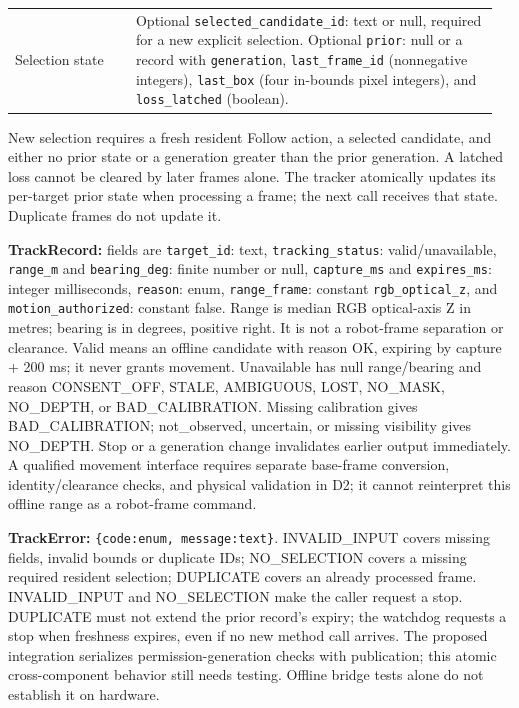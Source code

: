 \documentclass[12pt,letterpaper]{article}
\newcommand{\field}[1]{\texttt{#1}}
\begin{document}
\begin{longtable}{@{}>{\RaggedRight\arraybackslash}p{0.24\linewidth}>{\RaggedRight\arraybackslash}p{0.72\linewidth}@{}}
Selection state & Optional \field{selected\_candidate\_id}: text or null, required for a new explicit selection. Optional \field{prior}: null or a record with \field{generation}, \field{last\_frame\_id} (nonnegative integers), \field{last\_box} (four in-bounds pixel integers), and \field{loss\_latched} (boolean). \\
\end{longtable}
\endgroup

New selection requires a fresh resident Follow action, a selected candidate, and either no prior state or a generation greater than the prior generation. A latched loss cannot be cleared by later frames alone. The tracker atomically updates its per-target prior state when processing a frame; the next call receives that state. Duplicate frames do not update it.

\textbf{TrackRecord:} fields are \field{target\_id}: text, \field{tracking\_status}: valid/unavailable, \field{range\_m} and \field{bearing\_deg}: finite number or null, \field{capture\_ms} and \field{expires\_ms}: integer milliseconds, \field{reason}: enum, \field{range\_frame}: constant \field{rgb\_optical\_z}, and \field{motion\_authorized}: constant false. Range is median RGB optical-axis Z in metres; bearing is in degrees, positive right. It is not a robot-frame separation or clearance. Valid means an offline candidate with reason OK, expiring by capture + 200 ms; it never grants movement. Unavailable has null range/bearing and reason CONSENT\_OFF, STALE, AMBIGUOUS, LOST, NO\_MASK, NO\_DEPTH, or BAD\_CALIBRATION. Missing calibration gives BAD\_CALIBRATION; not\_observed, uncertain, or missing visibility gives NO\_DEPTH. Stop or a generation change invalidates earlier output immediately. A qualified movement interface requires separate base-frame conversion, identity/clearance checks, and physical validation in D2; it cannot reinterpret this offline range as a robot-frame command.

\textbf{TrackError:} \field{\{code:enum, message:text\}}. INVALID\_INPUT covers missing fields, invalid bounds or duplicate IDs; NO\_SELECTION covers a missing required resident selection; DUPLICATE covers an already processed frame. INVALID\_INPUT and NO\_SELECTION make the caller request a stop. DUPLICATE must not extend the prior record's expiry; the watchdog requests a stop when freshness expires, even if no new method call arrives. The proposed integration serializes permission-generation checks with publication; this atomic cross-component behavior still needs testing. Offline bridge tests alone do not establish it on hardware.
\end{document}
